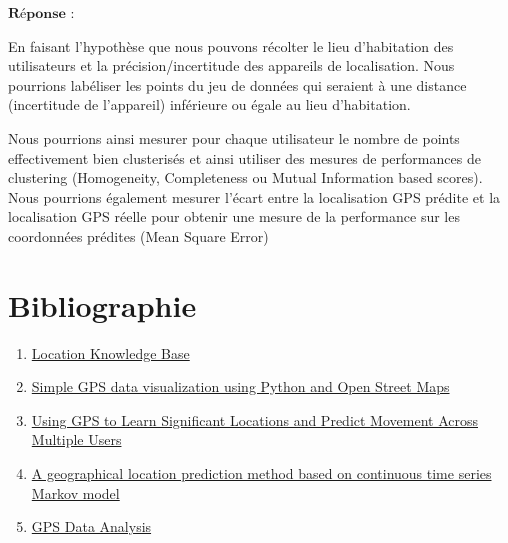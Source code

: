 \documentclass[10pt,a4paper]{article}
\begin{document}
\vspace{5mm}
$\textbf{Réponse : }$
\vspace{5mm}

En faisant l'hypothèse que nous pouvons récolter le lieu d'habitation des utilisateurs et la précision/incertitude des appareils de localisation.
Nous pourrions labéliser les points du jeu de données qui seraient à une distance (incertitude de l'appareil) inférieure ou égale au lieu d'habitation.

Nous pourrions ainsi mesurer pour chaque utilisateur le nombre de points effectivement bien clusterisés et ainsi utiliser des mesures de performances de clustering (Homogeneity, Completeness ou  Mutual Information based scores).
Nous pourrions également mesurer l'écart entre la localisation GPS prédite et la localisation GPS réelle pour obtenir une mesure de la performance sur les coordonnées prédites (Mean Square Error)


\vspace{5mm}

\section{Bibliographie}

\begin{enumerate}[(1)]
    \item \textrm{\href{https://www.quadrant.io/resources/location-data}{Location Knowledge Base} }
    \item \textrm{\href{https://towardsdatascience.com/simple-gps-data-visualization-using-python-and-open-street-maps-50f992e9b676}{Simple GPS data visualization using Python and Open Street Maps} }
    \item \textrm{\href{http://danielashbrook.com/pubs/2003 Ashbrook-Using GPS to Learn Significant Locations.pdf}{Using GPS to Learn Significant Locations and Predict Movement Across
                  Multiple Users} }
    \item \textrm{\href{https://www.ncbi.nlm.nih.gov/pmc/articles/PMC6242315/}{A geographical location prediction method based on continuous time series Markov model} }
    \item \textrm{\href{https://hrngok.github.io/posts/gps-data-analysis/}{GPS Data Analysis}}


          \vspace{5mm}
\end{enumerate}
\end{document}
